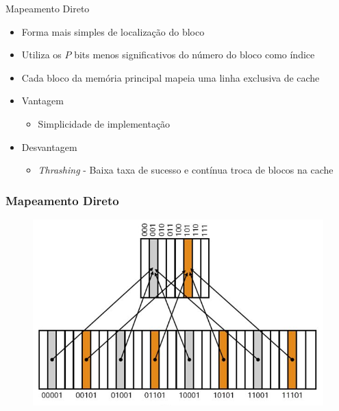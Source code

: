 \documentclass[aspectratio=169,
				xcolor=table]{beamer}
\begin{document}
	\begin{frame}{Mapeamento Direto}
		\begin{itemize}
			\item Forma mais simples de localização do bloco
			\item Utiliza os $P$ bits menos significativos do número do bloco como índice
			\item Cada bloco da memória principal mapeia uma linha exclusiva de cache
			\item Vantagem
			\begin{itemize}
				\item Simplicidade de implementação
			\end{itemize}
			\item Desvantagem
			\begin{itemize}
				\item \textit{Thrashing} - Baixa taxa de sucesso e contínua troca de blocos na cache
			\end{itemize}
		\end{itemize}
	\end{frame}	
	
	\begin{frame}
		\frametitle{Mapeamento Direto}
		\begin{figure}[hbtp]
			\centering
			\includegraphics[height=0.8\textheight, keepaspectratio]{../figs/cap06/cachedireto.png}
		\end{figure}		
	\end{frame}
	
\end{document}
